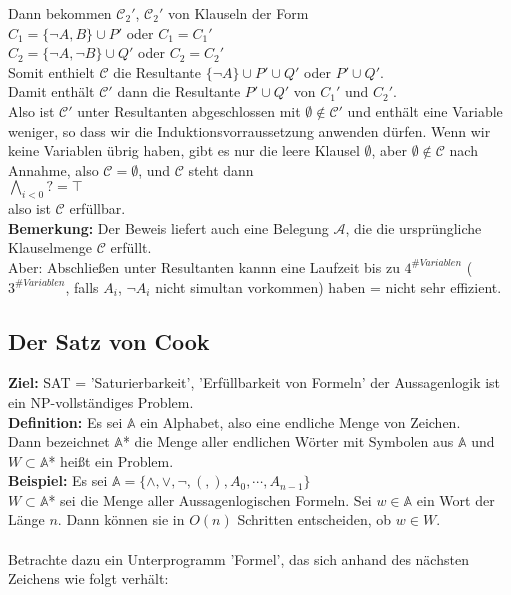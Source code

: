 \documentclass[a4paper]{scrartcl}
\begin{document}
Dann bekommen $\mathcal{C_{2}'}$, $\mathcal{C_{2}'}$ von Klauseln der Form \medskip\\
\colorbox{light-gray}{$C_{1}= \{\neg A,B\} \cup P'$ oder $C_{1}=C_{1}'$}\\
\colorbox{light-gray}{$C_{2}= \{\neg A,\neg B\} \cup Q'$ oder $C_{2}=C_{2}'$}\medskip\\
Somit enthielt $\mathcal{C}$ die Resultante $\{\neg A\} \cup P' \cup Q'$ oder $P' \cup Q'$.\\
Damit enthält $\mathcal{C'}$ dann die Resultante $P' \cup Q'$ von $C_{1}'$ und $C_{2}'$.\\
Also ist $\mathcal{C'}$ unter Resultanten abgeschlossen mit $\emptyset \notin \mathcal{C'}$ und enthält eine Variable weniger, so dass wir die Induktionsvorraussetzung anwenden dürfen. Wenn wir keine Variablen übrig haben, gibt es nur die leere Klausel $\emptyset$, aber  $\emptyset \notin \mathcal{C}$ nach Annahme, also $\mathcal{C} = \emptyset$, und $\mathcal{C}$ steht dann \medskip\\
\colorbox{light-gray}{$\bigwedge \limits_{i<0} ? = \top $}\medskip\\
also ist $\mathcal{C}$ erfüllbar.\medskip\\
\textbf{Bemerkung:} Der Beweis liefert auch eine Belegung $\mathcal{A}$, die die ursprüngliche Klauselmenge $\mathcal{C}$ erfüllt.\\
Aber: Abschließen unter Resultanten kannn eine Laufzeit bis zu $4^{\#Variablen}$ ($3^{\#Variablen}$, falls $A_{i}$, $\neg A_{i}$ nicht simultan vorkommen) haben = nicht sehr effizient. \\

\subsection{Der Satz von Cook}
\textbf{Ziel:} SAT = 'Saturierbarkeit', 'Erfüllbarkeit von Formeln' der Aussagenlogik ist ein NP-vollständiges Problem. \bigskip\\
\textbf{Definition:}
Es sei $\mathbb{A}$ ein Alphabet, also eine endliche Menge von Zeichen.\\
Dann bezeichnet $\mathbb{A}$* die Menge aller endlichen Wörter mit Symbolen aus $\mathbb{A}$ und $W \subset \mathbb{A}$* heißt ein Problem. \bigskip\\
\textbf{Beispiel:} Es sei \colorbox{light-gray}{$\mathbb{A} = \{ \wedge, \vee, \neg, (, ), A_{0}, \cdots ,  A_{n-1}\}$}\\
$W \subset \mathbb{A}$* sei die Menge aller Aussagenlogischen Formeln. Sei $w \in \mathbb{A}$ ein Wort der Länge $n$. Dann können sie in $O(n)$ Schritten entscheiden, ob $w \in W$.\bigskip\\\\
Betrachte dazu ein Unterprogramm 'Formel', das sich anhand des nächsten Zeichens wie folgt verhält: \\
\end{document}
